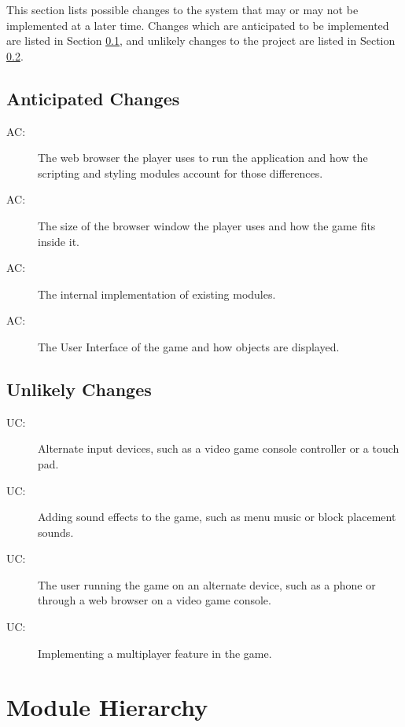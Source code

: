\documentclass[12pt, titlepage]{article}
\newcounter{acnum}
\newcommand{\actheacnum}{AC\theacnum}
\newcounter{ucnum}
\newcommand{\uctheucnum}{UC\theucnum}
\begin{document}
This section lists possible changes to the system that may or may not be implemented at a later time. Changes which are anticipated to be implemented are listed in Section \ref{SecAchange}, and
unlikely changes to the project are listed in Section \ref{SecUchange}.

\subsection{Anticipated Changes} \label{SecAchange}

\begin{description}
\item[ \actheacnum \label{acBrowser}:] 
The web browser the player uses to run the application and how the scripting and styling modules account for those differences.
\item[ \actheacnum \label{acWindow}:] 
The size of the browser window the player uses and how the game fits inside it.
\item[ \actheacnum \label{acModules}:] 
The internal implementation of existing modules.
\item[ \actheacnum \label{acUI}:] 
The User Interface of the game and how objects are displayed.
\end{description}

\subsection{Unlikely Changes} \label{SecUchange}

\begin{description}
\item[ \uctheucnum \label{ucInput}:] 
Alternate input devices, such as a video game console controller or a touch pad.
\item[ \uctheucnum \label{ucAudio}:] 
Adding sound effects to the game, such as menu music or block placement sounds.
\item[ \uctheucnum \label{ucDevice}:] 
The user running the game on an alternate device, such as a phone or through a web browser on a video game console.
\item[ \uctheucnum \label{ucPlayers}:] 
Implementing a multiplayer feature in the game.
\end{description}

\newpage
\section{Module Hierarchy} \label{SecMH}
\end{document}
